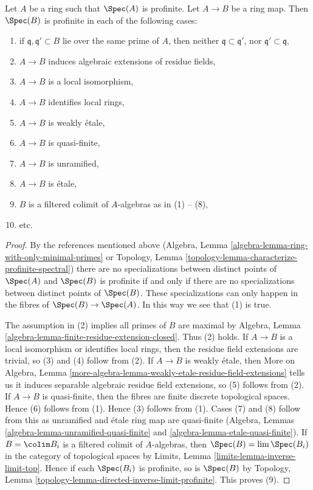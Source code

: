 \begin{lemma}
\label{lemma-profinite-goes-up}
Let $A$ be a ring such that $\Spec(A)$ is profinite. Let $A \to B$ be a
ring map. Then $\Spec(B)$ is profinite in each of the following cases:
\begin{enumerate}
\item if $\mathfrak q,\mathfrak q' \subset B$ lie over the same
prime of $A$, then neither $\mathfrak q \subset \mathfrak q'$, nor
$\mathfrak q' \subset \mathfrak q$,
\item $A \to B$ induces algebraic extensions of residue fields,
\item $A \to B$ is a local isomorphism,
\item $A \to B$ identifies local rings,
\item $A \to B$ is weakly \'etale,
\item $A \to B$ is quasi-finite,
\item $A \to B$ is unramified,
\item $A \to B$ is \'etale,
\item $B$ is a filtered colimit of $A$-algebras as in (1) -- (8),
\item etc.
\end{enumerate}
\end{lemma}

\begin{proof}
By the references mentioned above
(Algebra, Lemma \ref{algebra-lemma-ring-with-only-minimal-primes} or
Topology, Lemma \ref{topology-lemma-characterize-profinite-spectral})
there are no specializations between distinct points of $\Spec(A)$ and
$\Spec(B)$ is profinite if and only if there are no specializations
between distinct points of $\Spec(B)$. These specializations can only
happen in the fibres of $\Spec(B) \to \Spec(A)$. In this way we see
that (1) is true.

\medskip\noindent
The assumption in (2) implies all primes of $B$ are maximal by
Algebra, Lemma \ref{algebra-lemma-finite-residue-extension-closed}.
Thus (2) holds.
If $A \to B$ is a local isomorphism or identifies local rings,
then the residue field extensions are trivial, so (3) and (4)
follow from (2).
If $A \to B$ is weakly \'etale, then More on Algebra, Lemma
\ref{more-algebra-lemma-weakly-etale-residue-field-extensions}
tells us it induces separable algebraic residue field extensions, so
(5) follows from (2).
If $A \to B$ is quasi-finite, then the fibres are finite discrete
topological spaces. Hence (6) follows from (1).
Hence (3) follows from (1). Cases (7) and (8)
follow from this as unramified and \'etale ring map are quasi-finite
(Algebra, Lemmas
\ref{algebra-lemma-unramified-quasi-finite} and
\ref{algebra-lemma-etale-quasi-finite}).
If $B = \colim B_i$ is a filtered colimit of $A$-algebras, then
$\Spec(B) = \lim \Spec(B_i)$ in the category of topological spaces by
Limits, Lemma \ref{limits-lemma-inverse-limit-top}.
Hence if each $\Spec(B_i)$ is profinite, so is $\Spec(B)$ by
Topology, Lemma \ref{topology-lemma-directed-inverse-limit-profinite}.
This proves (9).
\end{proof}

